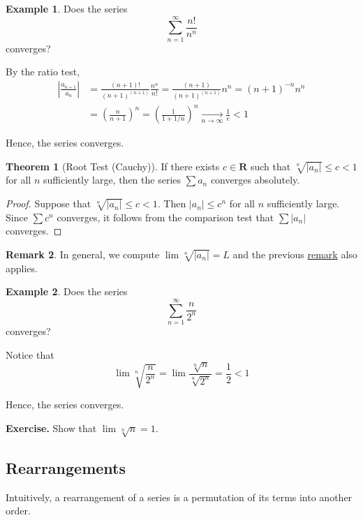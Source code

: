 \documentclass[12pt,a4paper]{article}
\theoremstyle{definition}
\newtheorem{theorem}{Theorem}[section]
\newtheorem{remark}[theorem]{Remark}
\newtheorem{example}{Example}[section]
\begin{document}
\begin{example}
	Does the series \[ \sum_{n=1}^\infty \frac{n!}{n^n} \] converges?
	
	By the ratio test,
	\begin{equation*}
		\begin{aligned}
			\left| \frac{a_{n+1}}{a_n} \right| &= \frac{(n+1)!}{(n+1)^{(n+1)}} \frac{n^n}{n!} = \frac{(n+1)}{(n+1)^{(n+1)}} n^n = (n+1)^{-n} n^n \\
			&= \left( \frac{n}{n+1} \right)^n = \left( \frac{1}{1+1/n} \right)^n \underset{n \to \infty}{\longrightarrow} \frac{1}{e} < 1
		\end{aligned}
	\end{equation*}
	
	Hence, the series converges.
\end{example}

\begin{theorem}[Root Test (Cauchy)]
	If there exists $c \in \textbf{R}$ such that $\sqrt[n]{|a_n|} \leq c < 1$ for all $n$ sufficiently large, then the series $\sum a_n$ converges absolutely.
\end{theorem}

\begin{proof}
	Suppose that $\sqrt[n]{|a_n|} \leq c < 1$. Then $|a_n| \leq c^n$ for all $n$ sufficiently large. Since $\sum c^n$ converges, it follows from the comparison test that $\sum |a_n|$ converges.
\end{proof}

\begin{remark}
	In general, we compute $\lim \sqrt[n]{|a_n|} = L$ and the previous \hyperref[ratiorootremark]{remark} also applies.
\end{remark}

\begin{example}
	Does the series \[ \sum_{n=1}^\infty \frac{n}{2^n} \] converges?
	
	Notice that
	\[
		\lim \sqrt[n]{\frac{n}{2^n}} = \lim \frac{\sqrt[n]{n}}{\sqrt[n]{2^n}} = \frac{1}{2} < 1
	\]
	
	Hence, the series converges.
\end{example}

\textbf{Exercise.} Show that $\lim \sqrt[n]{n} = 1$.

\subsection{Rearrangements}

Intuitively, a rearrangement of a series is a permutation of its terms into another order.
\end{document}
